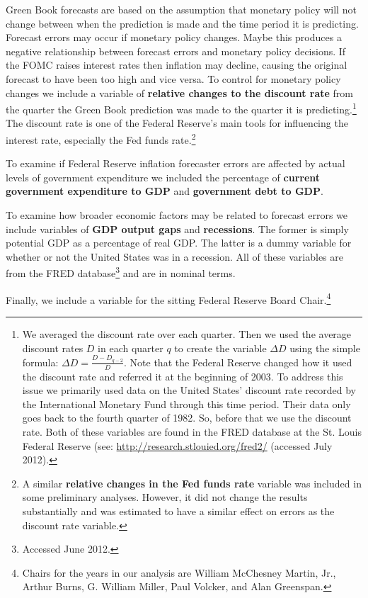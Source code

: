 \documentclass[a4paper]{article}\usepackage{graphicx, color}
\begin{document}
Green Book forecasts are based on the assumption that monetary policy will not change between when the prediction is made and the time period it is predicting. Forecast errors may occur if monetary policy changes. Maybe this produces a negative relationship between forecast errors and monetary policy decisions. If the FOMC raises interest rates then inflation may decline, causing the original forecast to have been too high and vice versa. To control for monetary policy changes we include a variable of {\bf{relative changes to the discount rate}} from the quarter the Green Book prediction was made to the quarter it is predicting.\footnote{We averaged the discount rate over each quarter. Then we used the average discount rates $D$ in each quarter $q$ to create the variable $\Delta D$ using the simple formula: $\Delta D = \frac{D - D_{q-2}}{D}$. Note that the Federal Reserve changed how it used the discount rate and referred it at the beginning of 2003. To address this issue we primarily used data on the United States' discount rate recorded by the International Monetary Fund through this time period. Their data only goes back to the fourth quarter of 1982. So, before that we use the discount rate. Both of these variables are found in the FRED database at the St. Louis Federal Reserve (see: {\url{http://research.stlouied.org/fred2/}} (accessed July 2012). } The discount rate is one of the Federal Reserve's main tools for influencing the interest rate, especially the Fed funds rate.\footnote{A similar {\bf{relative changes in the Fed funds rate}} variable was included in some preliminary analyses. However, it did not change the results substantially and was estimated to have a similar effect on errors as the discount rate variable.}

To examine if Federal Reserve inflation forecaster errors are affected by actual levels of government expenditure we included the percentage of {\bf{current government expenditure to GDP}} and {\bf{government debt to GDP}}. 

To examine how broader economic factors may be related to forecast errors we include variables of {\bf{GDP output gaps}} and {\bf{recessions}}. The former is simply potential GDP as a percentage of real GDP. The latter is a dummy variable for whether or not the United States was in a recession. All of these variables are from the FRED database\footnote{Accessed June 2012.} and are in nominal terms. 

Finally, we include a variable for the sitting Federal Reserve Board Chair.\footnote{Chairs for the years in our analysis are William McChesney Martin, Jr., Arthur Burns, G. William Miller, Paul Volcker, and Alan Greenspan.}
\end{document}
